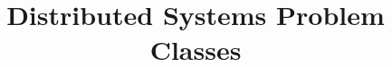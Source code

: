 \documentclass[a4paper, answers]{exam}
\title{Distributed Systems Problem Classes}
\author{}
\begin{document}
    \maketitle
    \begin{questions}
        
        
    \end{questions}
\end{document}
